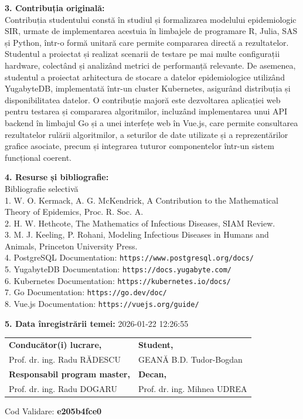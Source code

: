 {\textbf{3. Contribuția originală:}\\
Contribuția studentului constă în studiul și formalizarea modelului epidemiologic
SIR, urmate de implementarea acestuia în limbajele de programare R, Julia, SAS și
Python, într-o formă unitară care permite compararea directă a rezultatelor.
Studentul a proiectat și realizat scenarii de testare pe mai multe configurații
hardware, colectând și analizând metrici de performanță relevante. De asemenea,
studentul a proiectat arhitectura de stocare a datelor epidemiologice utilizând
YugabyteDB, implementată într-un cluster Kubernetes, asigurând distribuția și
disponibilitatea datelor. O contribuție majoră este dezvoltarea aplicației web
pentru testarea și compararea algoritmilor, incluzând implementarea unui API
backend în limbajul Go și a unei interfețe web în Vue.js, care permite
consultarea rezultatelor rulării algoritmilor, a seturilor de date utilizate și a
reprezentărilor grafice asociate, precum și integrarea tuturor componentelor
într-un sistem funcțional coerent.

\textbf{4. Resurse și bibliografie:}\\
Bibliografie selectivă\\
1. W. O. Kermack, A. G. McKendrick, A Contribution to the Mathematical Theory of Epidemics, Proc. R. Soc. A.\\
2. H. W. Hethcote, The Mathematics of Infectious Diseases, SIAM Review.\\
3. M. J. Keeling, P. Rohani, Modeling Infectious Diseases in Humans and Animals, Princeton University Press.\\
4. PostgreSQL Documentation: \texttt{https://www.postgresql.org/docs/}\\
5. YugabyteDB Documentation: \texttt{https://docs.yugabyte.com/}\\
6. Kubernetes Documentation: \texttt{https://kubernetes.io/docs/}\\
7. Go Documentation: \texttt{https://go.dev/doc/}\\
8. Vue.js Documentation: \texttt{https://vuejs.org/guide/}

\textbf{5. Data înregistrării temei:} 2026-01-22 12:26:55

\vspace{1.6em}

\noindent
\begin{tabular}{@{}p{}>{\raggedleft\arraybackslash}p{}@{}}
\textbf{Conducător(i) lucrare,}        & \textbf{Student,}            \\
Prof. dr. ing. Radu RĂDESCU            & GEANĂ B.D. Tudor-Bogdan      \\[2em]
\textbf{Responsabil program master,}   & \textbf{Decan,}              \\
Prof. dr. ing. Radu DOGARU             & Prof. dr. ing. Mihnea UDREA  \\
\end{tabular}

\vspace{1.6em}

\noindent Cod Validare: \textbf{e205b4fce0}

}
\cleardoublepage   %
